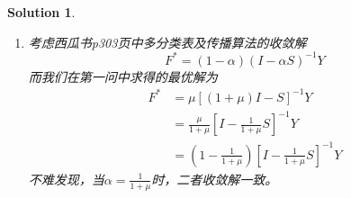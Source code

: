 \documentclass[a4paper,UTF8]{article}
\newtheorem*{solution}{Solution}
\numberwithin{equation}{section}
\begin{document}
\begin{solution}
\begin{enumerate}
​而(2.1)式等号右边第二项为
$$\sum_{i=1}^{n}\|F_{i} - Y_{i} \|^{2} = \sum_{i=1}^{n} \| (F-Y)_{i}\|^{2} = \| F - Y\|^{2}_{\mathcal{F}}$$
​综上，有
$$Q(F) = tr(F^{\top}F) - tr(SFF^{\top}) + \mu \| F - Y\|^{2}_{\mathcal{F}}$$
令
\begin{equation*}
	\begin{split}
		\frac{\partial{Q(F)}}{\partial{F}} &= 2F - (SF + S^{\top}F) + 2\mu(F-Y) \\
		&= 2(I - S + \mu I)F - 2\mu Y\\
		&=0
	\end{split}
\end{equation*}
解得
\begin{equation*}
	\begin{split}
		F^{*} &= (I - S + \mu I)^{-1}Y \\
		&= \left[(1+\mu)I - S\right]\mu Y \\
		&= \mu\left[(1+\mu)I -S \right]^{-1}Y
	\end{split}
\end{equation*}
\item 考虑西瓜书p303页中多分类表及传播算法的收敛解
$$F^{*} = (1-\alpha)(I - \alpha S)^{-1}Y$$
而我们在第一问中求得的最优解为
\begin{equation*}
	\begin{split}
		F^{*} &= \mu\left[(1+\mu)I -S \right]^{-1}Y\\
		&=\frac{\mu}{1+\mu} \left[I - \frac{1}{1+\mu}S\right]^{-1} Y\\
		&=(1-\frac{1}{1+\mu})\left[I - \frac{1}{1+\mu}S\right]^{-1} Y
	\end{split}
\end{equation*}
不难发现，当$\alpha=\frac{1}{1+\mu}$时，二者收敛解一致。
\end{enumerate}
\end{solution}
\end{document}
